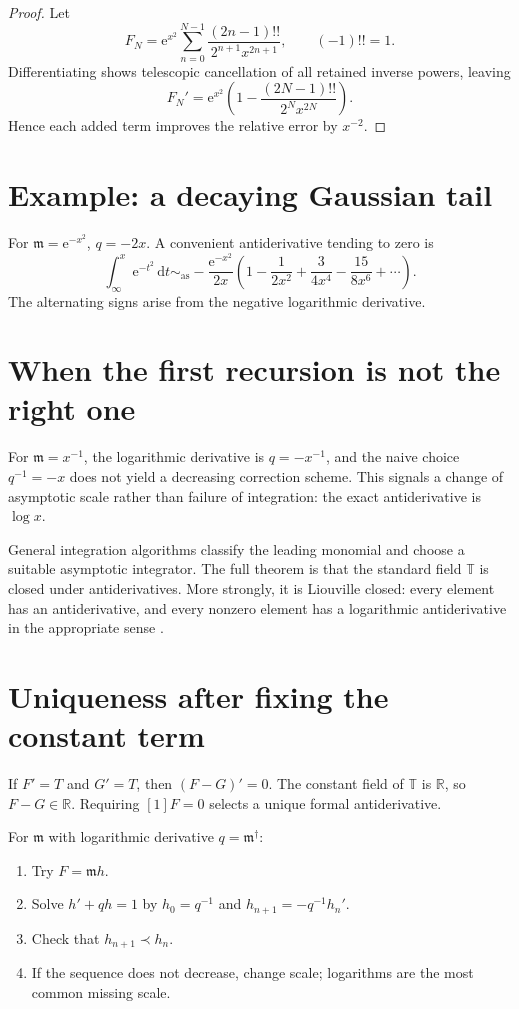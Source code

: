 \documentclass[11pt,oneside]{book}
\theoremstyle{definition}
\theoremstyle{remark}
\newcommand{\R}{\mathbb{R}}
\newcommand{\T}{\mathbb{T}}
\newcommand{\m}{\mathfrak{m}}
\newcommand{\asympseries}{\sim_{\!\mathrm{as}}}
\newcommand{\e}{\mathrm{e}}
\newcommand{\dd}{\,\mathrm{d}}
\newcommand{\precdom}{\prec}
\begin{document}
\begin{proof}
Let
\[
  F_N=\e^{x^2}\sum_{n=0}^{N-1}
  \frac{(2n-1)!!}{2^{n+1}x^{2n+1}},
  \qquad (-1)!!=1.
\]
Differentiating shows telescopic cancellation of all retained inverse powers,
leaving
\[
  F_N'=\e^{x^2}\left(1-
  \frac{(2N-1)!!}{2^N x^{2N}}
  \right).
\]
Hence each added term improves the relative error by $x^{-2}$.
\end{proof}

\section{Example: a decaying Gaussian tail}

For $\m=\e^{-x^2}$, $q=-2x$. A convenient antiderivative tending to zero is
\[
  \int_{\infty}^{x}\e^{-t^2}\dd t
  \asympseries
  -\frac{\e^{-x^2}}{2x}
  \left(1-\frac1{2x^2}+\frac3{4x^4}
  -\frac{15}{8x^6}+\cdots\right).
\]
The alternating signs arise from the negative logarithmic derivative.

\section{When the first recursion is not the right one}

For $\m=x^{-1}$, the logarithmic derivative is $q=-x^{-1}$, and the naive
choice $q^{-1}=-x$ does not yield a decreasing correction scheme. This signals a
change of asymptotic scale rather than failure of integration: the exact
antiderivative is $\log x$.

General integration algorithms classify the leading monomial and choose a
suitable asymptotic integrator. The full theorem is that the standard field
$\T$ is closed under antiderivatives. More strongly, it is Liouville closed:
every element has an antiderivative, and every nonzero element has a logarithmic
antiderivative in the appropriate sense \cite{vanDerHoevenBook,ADHBook}.

\section{Uniqueness after fixing the constant term}

If $F'=T$ and $G'=T$, then $(F-G)'=0$. The constant field of $\T$ is $\R$, so
$F-G\in\R$. Requiring $[1]F=0$ selects a unique formal antiderivative.

\begin{recipebox}[title=Asymptotic integration of a rapidly varying monomial]
For $\m$ with logarithmic derivative $q=\m^\dagger$:
\begin{enumerate}
\item Try $F=\m h$.
\item Solve $h'+qh=1$ by $h_0=q^{-1}$ and
      $h_{n+1}=-q^{-1}h_n'$.
\item Check that $h_{n+1}\precdom h_n$.
\item If the sequence does not decrease, change scale; logarithms are the most
      common missing scale.
\end{enumerate}
\end{recipebox}
\end{document}
